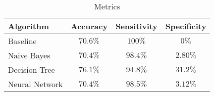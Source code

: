 \begin{table}
	\begin{center}
		\caption{Metrics}
		\label{metrics}
		\begin{tabular}{ l | c | c | c  }
			Algorithm & Accuracy & Sensitivity & Specificity \\
			\hline		
			Baseline & $70.6\%$ & $100\%$ & $0\%$ \\
			Naive Bayes & $70.4\%$ & $98.4\%$ & $2.80\%$ \\
			Decision Tree & $76.1\%$ & $94.8\%$ & $31.2\%$ \\
			Neural Network & $70.4\%$ & $98.5\%$ & $3.12\%$
		\end{tabular}
	\end{center}
\end{table}